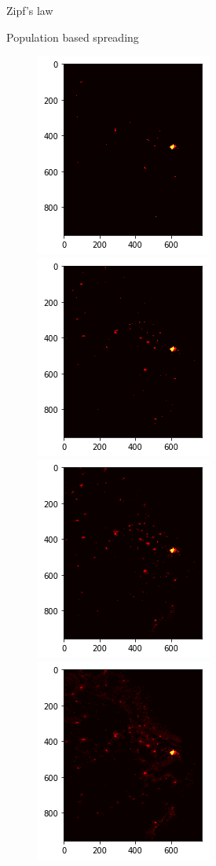 \documentclass{beamer}
\begin{document}
\begin{frame}{Zipf's law}
\begin{frame}{Population based spreading}
  \begin{figure}
    \includegraphics[width = 0.34\linewidth]{pics/ntl/ntl_4.png}
    \includegraphics[width = 0.34\linewidth]{pics/ntl/ntl_3.png}
    \includegraphics[width = 0.34\linewidth]{pics/ntl/ntl_2.png}
    \includegraphics[width = 0.34\linewidth]{pics/ntl/ntl_1.png}
  \end{figure}
\end{frame}


\end{frame}
\end{document}
